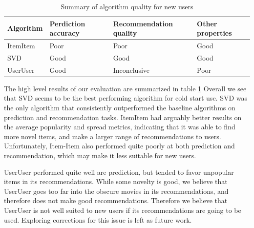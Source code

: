 \documentclass[letterpaper]{sig-alternate}
\begin{document}
    
  \begin{table}[ht!]
    \centering
    \begin{tabular}{|p{4.5em}|p{4.5em}|p{7.5em}|p{4.5em}|}
      \hline
      Algorithm & Perdiction accuracy & Recommendation quality      & Other properties \\\hline
      ItemItem  & Poor                & Poor                        & Good             \\\hline
      SVD       & Good                & Good                        & Good             \\\hline
      UserUser  & Good                & Inconclusive                & Poor             \\\hline
    \end{tabular}
    \caption{Summary of algorithm quality for new users}
    \label{tbl:results}
  \end{table}

  The high level results of our evaluation are summarized in table \ref{tbl:results}
  Overall we see that SVD seems to be the best performing algorithm for cold start use.
  SVD was the only algorithm that consistently outperformed the baseline algorithms on prediction and recommendation tasks.
  ItemItem had arguably better results on the average popularity and spread metrics, indicating that it was able to find more novel items, and make a larger range of recommendations to users.
  Unfortunately, Item-Item also performed quite poorly at both prediction and recommendation, which may make it less suitable for new users.

  UserUser performed quite well are prediction, but tended to favor unpopular items in its recommendations.
  While some novelty is good, we believe that UserUser goes too far into the obscure movies in its recommendations, and therefore does not make good recommendations.
  Therefore we believe that UserUser is not well suited to new users if its recommendations are going to be used.
  Exploring corrections for this issue is left as future work.
\end{document}
